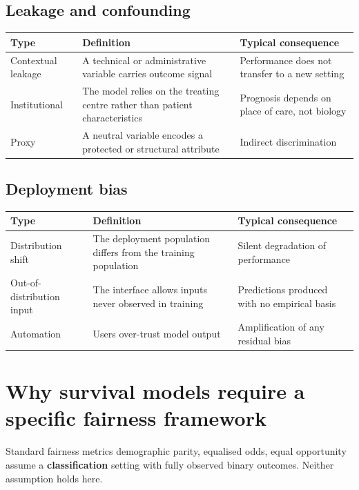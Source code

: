 \documentclass[11pt,a4paper]{article}
\begin{document}
\subsection{Leakage and confounding}

\begin{longtable}{@{}p{3.6cm} p{5.5cm} p{5.5cm}@{}}
\toprule
\textbf{Type} & \textbf{Definition} & \textbf{Typical consequence} \\
\midrule
\endhead
Contextual leakage & A technical or administrative variable carries outcome signal &
Performance does not transfer to a new setting \\
\addlinespace
Institutional & The model relies on the treating centre rather than patient characteristics &
Prognosis depends on place of care, not biology \\
\addlinespace
Proxy & A neutral variable encodes a protected or structural attribute & Indirect
discrimination \\
\bottomrule
\end{longtable}

\subsection{Deployment bias}

\begin{longtable}{@{}p{3.6cm} p{5.5cm} p{5.5cm}@{}}
\toprule
\textbf{Type} & \textbf{Definition} & \textbf{Typical consequence} \\
\midrule
\endhead
Distribution shift & The deployment population differs from the training population & Silent
degradation of performance \\
\addlinespace
Out-of-distribution input & The interface allows inputs never observed in training &
Predictions produced with no empirical basis \\
\addlinespace
Automation & Users over-trust model output & Amplification of any residual bias \\
\bottomrule
\end{longtable}

\section{Why survival models require a specific fairness framework}

Standard fairness metrics demographic parity, equalised odds, equal opportunity  assume
a \textbf{classification} setting with fully observed binary outcomes. Neither assumption holds
here.
\end{document}
